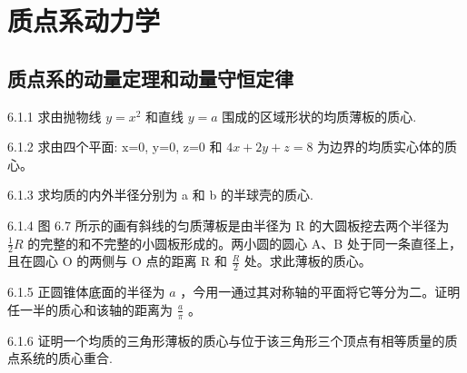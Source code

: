 \chapter{质点系动力学}

\section{质点系的动量定理和动量守恒定律}

\begin{problem}{6.1.1}
求由抛物线 $y = x^2$ 和直线 $y = a$ 围成的区域形状的均质薄板的质心.
\end{problem}
\clearpage


\begin{problem}{6.1.2}
求由四个平面: x=0, y=0, z=0 和 $4x+2y+z=8$ 为边界的均质实心体的质心。
\end{problem}
\clearpage


\begin{problem}{6.1.3}
求均质的内外半径分别为 a 和 b 的半球壳的质心.
\end{problem}
\clearpage


\begin{problem}{6.1.4}
图 6.7 所示的画有斜线的匀质薄板是由半径为 R 的大圆板挖去两个半径为 $\frac{1}{2}R$ 的完整的和不完整的小圆板形成的。两小圆的圆心 A、B 处于同一条直径上，且在圆心 O 的两侧与 O 点的距离 R 和 $\frac{R}{2}$ 处。求此薄板的质心。
\begin{center}

\end{center}
\end{problem}
\clearpage


\begin{problem}{6.1.5}
正圆锥体底面的半径为 $a$ ，今用一通过其对称轴的平面将它等分为二。证明任一半的质心和该轴的距离为 $\frac{a}{\pi}$ 。
\begin{center}

\end{center}
\end{problem}
\clearpage


\begin{problem}{6.1.6}
证明一个均质的三角形薄板的质心与位于该三角形三个顶点有相等质量的质点系统的质心重合.
\end{problem}
\clearpage


